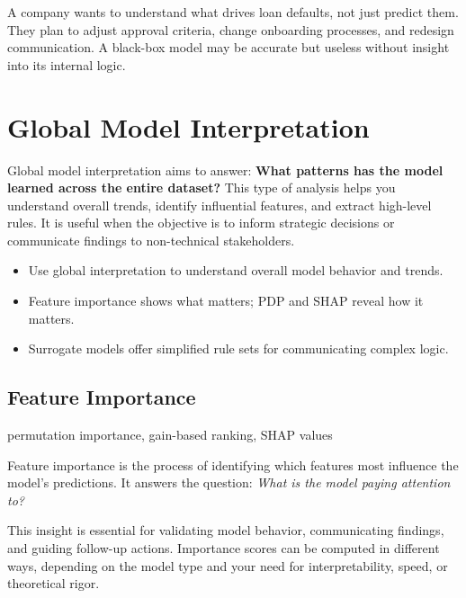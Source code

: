 \documentclass[12pt,openany, draft]{book}
\begin{document}
\begin{examplebox}
A company wants to understand what drives loan defaults, not just predict them. They plan to adjust approval criteria, change onboarding processes, and redesign communication. A black-box model may be accurate but useless without insight into its internal logic.
\end{examplebox}




\chapter{Global Model Interpretation}

Global model interpretation aims to answer: \textbf{What patterns has the model learned across the entire dataset?} This type of analysis helps you understand overall trends, identify influential features, and extract high-level rules. It is useful when the objective is to inform strategic decisions or communicate findings to non-technical stakeholders.


\begin{summarybox}
\begin{itemize}
  \item Use global interpretation to understand overall model behavior and trends.
  \item Feature importance shows what matters; PDP and SHAP reveal how it matters.
  \item Surrogate models offer simplified rule sets for communicating complex logic.
\end{itemize}
\end{summarybox}



\section{Feature Importance}

\begin{keywordsbox}
permutation importance, gain-based ranking, SHAP values
\end{keywordsbox}

Feature importance is the process of identifying which features most influence the model’s predictions. It answers the question: \textit{What is the model paying attention to?}

This insight is essential for validating model behavior, communicating findings, and guiding follow-up actions. Importance scores can be computed in different ways, depending on the model type and your need for interpretability, speed, or theoretical rigor.
\end{document}
